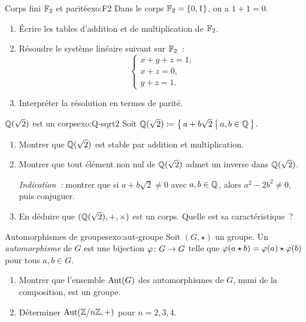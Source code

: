 \begin{exercise}{\intermediate{} Corps fini ${\mathbb{F}}_2$ et parité}{exo:F2}
  Dans le corps ${\mathbb{F}}_2=\left\{0,1\right\}$, on a $1+1=0$.
  \begin{enumerate}[label=(\alph*)]
    \item Écrire les tables d'addition et de multiplication de ${\mathbb{F}}_2$.
    \item Résoudre le système linéaire suivant sur ${\mathbb{F}}_2$~:
      \[
        \begin{cases}
          x+y+z=1,\\
          x+z=0,\\
          y+z=1.
        \end{cases}
      \]
    \item Interpréter la résolution en termes de parité.
  \end{enumerate}
\end{exercise}

\begin{exercise}{\challenging{} ${\mathbb{Q}}(\sqrt{2})$ est un corps}{exo:Q-sqrt2}
  Soit ${\mathbb{Q}}(\sqrt{2})\coloneqq\left\{\,a+b\sqrt{2}\;\middle|\;a,b\in{\mathbb{Q}}\,\right\}$.
  \begin{enumerate}[label=(\alph*)]
    \item Montrer que ${\mathbb{Q}}(\sqrt{2})$ est stable par addition et
      multiplication.
    \item Montrer que tout élément non nul de ${\mathbb{Q}}(\sqrt{2})$ admet un
      inverse dans ${\mathbb{Q}}(\sqrt{2})$.

      \emph{Indication~:} montrer que si $a+b\sqrt{2}\neq 0$ avec
      $a,b\in{\mathbb{Q}}$, alors $a^2-2b^2\neq 0$, puis conjuguer.
    \item En déduire que $({\mathbb{Q}}(\sqrt{2}),+,\times)$ est un corps. Quelle
      est sa caractéristique~?
  \end{enumerate}
\end{exercise}

\begin{exercise}{\challenging{} Automorphismes de groupes}{exo:aut-groupe}
  Soit $(G,\star)$ un groupe. Un \emph{automorphisme} de $G$ est une
  bijection $\varphi\colon G\to G$ telle que
  $\varphi(a\star b)=\varphi(a)\star\varphi(b)$ pour tous $a,b\in G$.
  \begin{enumerate}[label=(\alph*)]
    \item Montrer que l'ensemble $\operatorname{Aut}(G)$ des automorphismes de $G$,
      muni de la composition, est un groupe.
    \item Déterminer $\operatorname{Aut}({\mathbb{Z}}/n{\mathbb{Z}},+)$ pour $n=2,3,4$.
  \end{enumerate}
\end{exercise}

